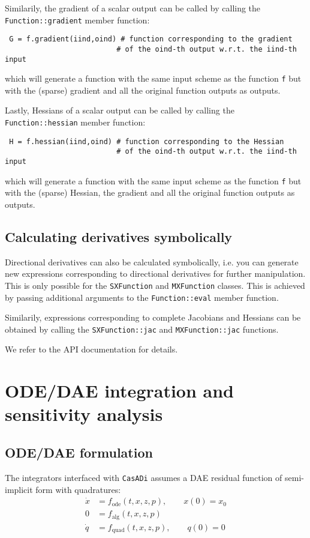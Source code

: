 \documentclass[a4paper,12pt]{book}
\newcommand{\CasADi}{\texttt{CasADi}\xspace}
\begin{document}
Similarily, the gradient of a scalar output can be called by calling the \texttt{Function::gradient} member function:
\begin{verbatim}
 G = f.gradient(iind,oind) # function corresponding to the gradient
                          # of the oind-th output w.r.t. the iind-th input
\end{verbatim}
which will generate a function with the same input scheme as the function \texttt{f} but with the (sparse) gradient and all the original function outputs as outputs.

Lastly, Hessians of a scalar output can be called by calling the \texttt{Function::hessian} member function:
\begin{verbatim}
 H = f.hessian(iind,oind) # function corresponding to the Hessian
                          # of the oind-th output w.r.t. the iind-th input
\end{verbatim}
which will generate a function with the same input scheme as the function \texttt{f} but with the (sparse) Hessian, the gradient and all the original function outputs as outputs.

\section{Calculating derivatives symbolically}
Directional derivatives can also be calculated symbolically, i.e. you can generate new expressions corresponding to directional derivatives for further manipulation. This is only possible for the \texttt{SXFunction} and \texttt{MXFunction} classes.
This is achieved by passing additional arguments to the \texttt{Function::eval} member function.

Similarily, expressions corresponding to complete Jacobians and Hessians can be obtained by calling the \texttt{SXFunction::jac} and \texttt{MXFunction::jac} functions.

We refer to the API documentation for details.

\chapter{ODE/DAE integration and sensitivity analysis} \label{chapter:integrators}
\section{ODE/DAE formulation}
The integrators interfaced with \CasADi assumes a DAE residual function of semi-implicit form with quadratures:
\begin{subequations}
\begin{align}
 \dot{x} &= f_{\text{ode}}(t,x,z,p), \qquad x(0) = x_0 \\
      0  &= f_{\text{alg}}(t,x,z,p) \\
 \dot{q} &= f_{\text{quad}}(t,x,z,p), \qquad q(0) = 0
\end{align}
\end{subequations}
\end{document}
